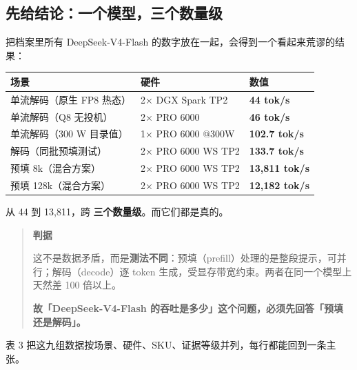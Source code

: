 \subsection{先给结论：一个模型，三个数量级}

把档案里所有 DeepSeek-V4-Flash 的数字放在一起，会得到一个看起来荒谬的结果：


\begin{table}[t]
\centering
\footnotesize
\setlength{\tabcolsep}{4pt}
\label{tab:13}
\begin{tabular}{lll}
\toprule
场景 & 硬件 & 数值 \\
\midrule
单流解码（原生 FP8 热态） & 2× DGX Spark TP2 & \textbf{44 tok/s} \\
单流解码（Q8 无投机） & 2× PRO 6000 & \textbf{46 tok/s} \\
单流解码（300 W 目录值） & 1× PRO 6000 @300W & \textbf{102.7 tok/s} \\
解码（同批预填测试） & 2× PRO 6000 WS TP2 & \textbf{133.7 tok/s} \\
预填 8k（混合方案） & 2× PRO 6000 WS TP2 & \textbf{13,811 tok/s} \\
预填 128k（混合方案） & 2× PRO 6000 WS TP2 & \textbf{12,182 tok/s} \\
\bottomrule
\end{tabular}
\end{table}

从 44 到 13,811，跨 \textbf{三个数量级}。而它们都是真的。


\begin{quote}\small
\textbf{ 判据}

这不是数据矛盾，而是\textbf{测法不同}：预填（prefill）处理的是整段提示，可并行；解码（decode）逐 token 生成，受显存带宽约束。两者在同一个模型上天然差 100 倍以上。

\textbf{故「DeepSeek-V4-Flash 的吞吐是多少」这个问题，必须先回答「预填还是解码」。}

\end{quote}

表 3 把这九组数据按场景、硬件、SKU、证据等级并列，每行都能回到一条主张。


